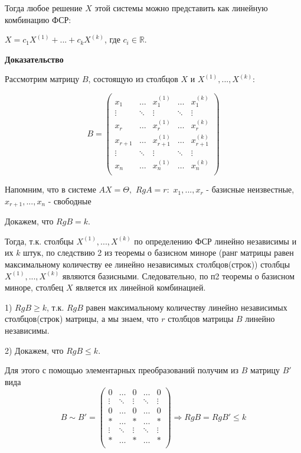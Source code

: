 Тогда любое решение $X$ этой системы можно представить как линейную комбинацию ФСР:

$X = c_1X^{(1)} + ... + c_kX^{(k)}$, где $c_i \in \mathbb{R}$.

\vspace*{15pt}

{\bf {Доказательство}}

Рассмотрим матрицу $B$, состоящую из столбцов $X$ и $X^{(1)}, ..., X^{(k)}$:

$$
B = 
\begin{pmatrix}
x_{1}&\ldots&x_1^{(1)}&\ldots&x_1^{(k)}\\
\vdots&\ddots&\vdots&\ddots&\vdots\\
x_{r}&\ldots&x_r^{(1)}&\ldots&x_r^{(k)}\\
x_{r+1}&\ldots&x_{r+1}^{(1)}&\ldots&x_{r+1}^{(k)}\\
\vdots&\ddots&\vdots&\ddots&\vdots\\
x_{n}&\ldots&x_n^{(1)}&\ldots&x_n^{(k)}\\
\end{pmatrix}
$$

Напомним, что в системе $AX = \Theta,$ $RgA = r:$ $x_1, ..., x_r$ - базисные неизвестные, $x_{r+1}, ..., x_n$ - свободные

Докажем, что $RgB = k$. 

Тогда, т.к. столбцы $X^{(1)}, ..., X^{(k)}$ по определению ФСР линейно независимы и их $k$ штук, по следствию 2 из теоремы о базисном миноре (ранг матрицы равен максимальному количеству ее линейно независимых столбцов(строк)) столбцы $X^{(1)}, ..., X^{(k)}$ являются базисными. Следовательно, по п2 теоремы о базисном миноре, столбец $X$ является их линейной комбинацией.

1) $RgB \geqslant k$, т.к. $RgB$ равен максимальному количеству линейно независимых столбцов(строк) матрицы, а мы знаем, что $r$ столбцов матрицы $B$ линейно независимы.

2) Докажем, что $RgB \leqslant k$.

Для этого с помощью элементарных преобразований получим из $B$ матрицу $B'$ вида 
$$B\sim B' = 
\begin{pmatrix}
    0&\ldots&0&\ldots&0\\
    \vdots&\ddots&\vdots&\ddots&\vdots\\
    0&\ldots&0&\ldots&0\\
    *&\ldots&*&\ldots&*\\
    \vdots&\ddots&\vdots&\ddots&\vdots\\
    *&\ldots&*&\ldots&*\\
\end{pmatrix}
\Rightarrow RgB = RgB' \leqslant k
$$

